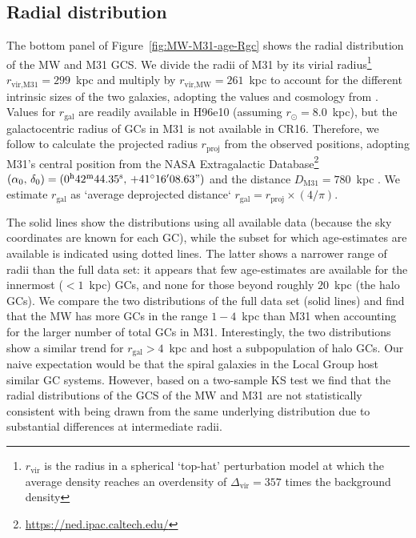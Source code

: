 \documentclass[a4paper,fleqn,usenatbib]{mnras}
\begin{document}
\subsection{Radial distribution}
\label{sec:Rgc}
The bottom panel of Figure~\ref{fig:MW-M31-age-Rgc} shows the radial distribution
of the MW and M31 GCS. We divide the radii of M31 by its virial radius\footnote{
$r_{\text{vir}}$ is the radius in a spherical `top-hat' perturbation model at which
the average density reaches an overdensity of $\Delta_{\text{vir}}=357$ times the 
background density} $r_{\text{vir,M31}} = 299$~kpc and multiply by 
$r_{\text{vir,MW}} = 261$~kpc to account for the different intrinsic sizes of the two
galaxies, adopting the values and cosmology from \citet{2017MNRAS.464.3825P}.
Values for $r_{\text{gal}}$ are readily available in H96e10 (assuming $r_{\odot}=8.0$~kpc), 
but the galactocentric radius of GCs in M31 is not available in CR16. Therefore, we 
follow \citet[][section~4.1]{2019A&A...623A..65W} 
to calculate the projected radius $r_{\text{proj}}$ from the observed positions,
adopting M31's central position from the NASA Extragalactic 
Database\footnote{\url{https://ned.ipac.caltech.edu/}} $(\alpha_0, \, \delta_0) =
(0^{\text{h}}42^{\text{m}}44.35^{\text{s}}, \, +41^{\circ}16'08.63")$
and the distance $D_{\text{M31}} = 780$~kpc \citep{2005MNRAS.356..979M,2012ApJ...758...11C}.
We estimate $r_{\text{gal}}$ as `average deprojected distance`
$r_{\text{gal}} = r_{\text{proj}} \times (4/\pi)$. 

The solid lines show the distributions using all available data (because the
sky coordinates are known for each GC), while the subset for which age-estimates
are available is indicated using dotted lines. The latter shows a narrower range
of radii than the full data set: it appears that few age-estimates are available 
for the innermost ($<1$~kpc) GCs, and none for those beyond roughly $20$~kpc
(the halo GCs). We compare the two distributions of the full data set (solid 
lines) and find that the MW has more GCs in the range $1-4$~kpc than M31
when accounting for the larger number of total GCs in M31. Interestingly, the two 
distributions show a similar trend for $r_{\text{gal}} > 4$~kpc and host a 
subpopulation of halo GCs. Our naive expectation would be that the spiral galaxies
in the Local Group host similar GC systems. However, based on a two-sample KS test
we find that the radial distributions of the GCS of the MW and M31 are not statistically 
consistent with being drawn from the same underlying distribution due to substantial 
differences at intermediate radii. 
\end{document}
